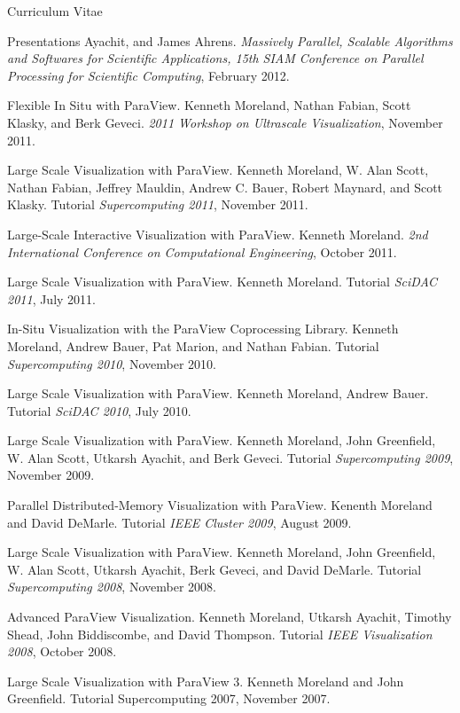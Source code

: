 \documentclass{article}
\begin{document}
\begin{cv}{Curriculum Vitae}
\begin{cvlist}{Presentations}
      Ayachit, and James Ahrens. \emph{Massively Parallel, Scalable
        Algorithms and Softwares for Scientific Applications, 15th SIAM
        Conference on Parallel Processing for Scientific Computing},
      February 2012.
    \item[Flexible In Situ with ParaView.] Kenneth Moreland, Nathan Fabian,
      Scott Klasky, and Berk Geveci. \emph{2011 Workshop on Ultrascale
        Visualization}, November 2011.
    \item[Large Scale Visualization with ParaView.] Kenneth Moreland,
      W. Alan Scott, Nathan Fabian, Jeffrey Mauldin, Andrew C. Bauer,
      Robert Maynard, and Scott Klasky. Tutorial \emph{Supercomputing
        2011}, November 2011.
    \item[Large-Scale Interactive Visualization with ParaView.] Kenneth
      Moreland. \emph{2nd International Conference on Computational
        Engineering}, October 2011.
    \item[Large Scale Visualization with ParaView.] Kenneth
      Moreland. Tutorial \emph{SciDAC 2011}, July 2011.
    \item[In-Situ Visualization with the ParaView Coprocessing Library.]
      Kenneth Moreland, Andrew Bauer, Pat Marion, and Nathan
      Fabian. Tutorial \emph{Supercomputing 2010}, November 2010.
    \item[Large Scale Visualization with ParaView.] Kenneth Moreland,
      Andrew Bauer. Tutorial \emph{SciDAC 2010}, July 2010.
    \item[Large Scale Visualization with ParaView.] Kenneth Moreland, John
      Greenfield, W. Alan Scott, Utkarsh Ayachit, and Berk Geveci. Tutorial
      \emph{Supercomputing 2009}, November 2009.
    \item[Parallel Distributed-Memory Visualization with ParaView.] Kenenth
      Moreland and David DeMarle. Tutorial \emph{IEEE Cluster 2009}, August
      2009.
    \item[Large Scale Visualization with ParaView.] Kenneth Moreland, John
      Greenfield, W. Alan Scott, Utkarsh Ayachit, Berk Geveci, and David
      DeMarle. Tutorial \emph{Supercomputing 2008}, November 2008.
    \item[Advanced ParaView Visualization.] Kenneth Moreland, Utkarsh
      Ayachit, Timothy Shead, John Biddiscombe, and David
      Thompson. Tutorial \emph{IEEE Visualization 2008}, October 2008.
    \item[Large Scale Visualization with ParaView 3.] Kenneth Moreland and
      John Greenfield. Tutorial Supercomputing 2007, November 2007.

\end{cvlist}
\end{cv}
\end{document}
